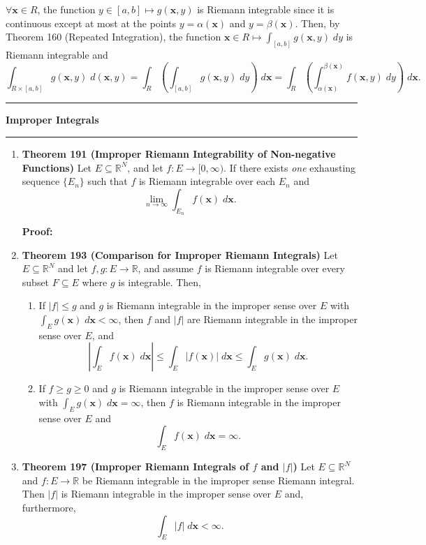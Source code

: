 \documentclass[11pt]{article}
\newcommand{\bx}{\mathbf{x}}
\newcommand{\Rint}{Riemann integrable }
\begin{document}
\begin{enumerate}
$\forall \bx \in R$, the function $y \in [a,b] \mapsto g(\bx,y)$ is \Rint
since it is continuous except at most at the points $y = \alpha(\bx)$ and
$y = \beta(\bx)$. Then, by Theorem 160 (Repeated Integration), the function
$\bx \in R \mapsto \int_{[a,b]} g(\bx,y) \; dy$ is \Rint and
\[\int_{R \times [a,b]}g(\bx,y) \; d(\bx,y)
 = \int_R \left(\int_{[a,b]} g(\bx,y)\; dy\right)\; d\bx
 = \int_R \left(\int_{\alpha(\bx)}^{\beta(\bx)} f(\bx,y)\; dy\right)\; d\bx.\]

\end{enumerate}
\hrule
{\Large \bf Improper Integrals}
\vspace{1mm}
\hrule
\begin{enumerate}
\item \textbf{Theorem 191 (Improper Riemann Integrability of Non-negative
                                                                   Functions)}
Let $E \subseteq \mathbb{R}^N$, and let $f: E \rightarrow [0,\infty)$. If
there exists \emph{one} exhausting sequence $\{E_n\}$ such that $f$ is \Rint
over each $E_n$ and
\[\lim_{n \rightarrow \infty} \int_{E_n} f(\bx) \; d\bx.\]

{\bf Proof:}

\item \textbf{Theorem 193 (Comparison for Improper Riemann Integrals)}
Let $E \subseteq \mathbb{R}^N$ and let $f,g: E \rightarrow \mathbb{R}$, and
assume $f$ is \Rint over every subset $F \subseteq E$ where $g$ is integrable.
Then,
\begin{enumerate}
\item If $|f| \leq g$ and $g$ is \Rint in the improper sense over $E$ with
$\int_E g(\bx) \; d\bx < \infty$, then $f$ and $|f|$ are \Rint in the improper
sense over $E$, and
\[\left|\int_E f(\bx) \; d\bx\right|
 \leq \int_E |f(\bx)| \; d\bx
 \leq \int_E g(\bx) \; d\bx.
\]

\item If $f \geq g \geq 0$ and $g$ is \Rint in the improper sense over $E$
with $\int_E g(\bx) \; d\bx = \infty$, then $f$ is \Rint in the improper sense
over $E$ and \[\int_E f(\bx) \; d\bx = \infty.\]
\end{enumerate}

\item \textbf{Theorem 197 (Improper Riemann Integrals of $f$ and $|f|$)}
Let $E \subseteq \mathbb{R}^N$ and $f: E \rightarrow \mathbb{R}$ be \Rint in
the improper sense Riemann integral. Then $|f|$ is \Rint in the improper sense
over $E$ and, furthermore,
\[\int_E |f| \; d\bx < \infty.\]
\end{enumerate}
\end{document}
